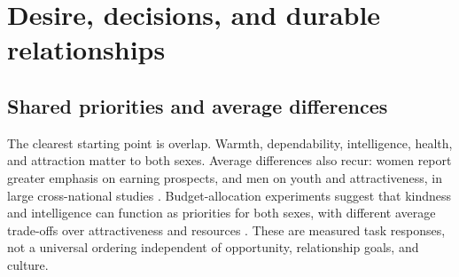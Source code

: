\documentclass[10pt,twocolumn,letterpaper]{article}
\begin{document}
\section{Desire, decisions, and durable relationships}
\subsection{Shared priorities and average differences}
The clearest starting point is overlap. Warmth, dependability, intelligence, health, and attraction matter to both sexes. Average differences also recur: women report greater emphasis on earning prospects, and men on youth and attractiveness, in large cross-national studies \citep{walter2020}. Budget-allocation experiments suggest that kindness and intelligence can function as priorities for both sexes, with different average trade-offs over attractiveness and resources \citep{li2002}. These are measured task responses, not a universal ordering independent of opportunity, relationship goals, and culture.
\end{document}
